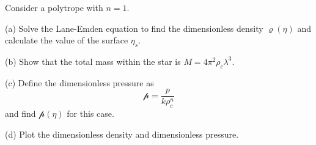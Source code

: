 \begin{problem}[Polytropes]
\label{prob_lane_emden} 
Consider a polytrope with $n=1$.  

(a) Solve the Lane-Emden equation to find the dimensionless density $\varrho(\eta)$ and calculate the value of the surface $\eta_s$.

(b) Show that the total mass within the star is $M = 4\pi^2 \rho_c \lambda^3$.

(c) Define the dimensionless pressure as 
\[
\mathscr{p} = \frac{p}{k\rho_c^n}
\]
and find $\mathscr{p}(\eta)$ for this case.

(d) Plot the dimensionless density and dimensionless pressure.
\end{problem}




